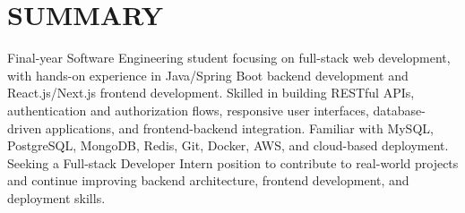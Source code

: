 \section{SUMMARY}
\noindent Final-year Software Engineering student focusing on full-stack web development, with hands-on experience in Java/Spring Boot backend development and React.js/Next.js frontend development. Skilled in building RESTful APIs, authentication and authorization flows, responsive user interfaces, database-driven applications, and frontend-backend integration. Familiar with MySQL, PostgreSQL, MongoDB, Redis, Git, Docker, AWS, and cloud-based deployment. Seeking a Full-stack Developer Intern position to contribute to real-world projects and continue improving backend architecture, frontend development, and deployment skills.
